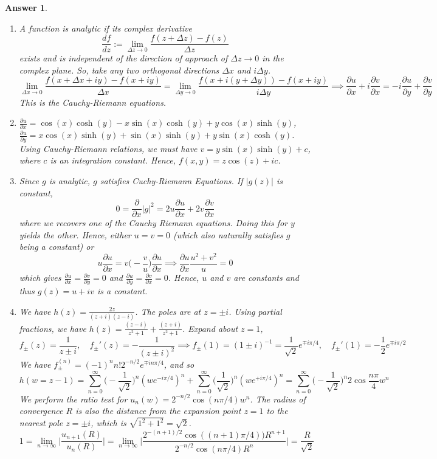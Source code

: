 \documentclass[a4paper]{article}
\newtheorem{ans}{Answer}[section]
\theoremstyle{new}
\begin{document}
\begin{ans}\leavevmode
\begin{enumerate}[label=(\alph*)]
\item A function is analytic if its complex derivative
$$\frac{df}{dz}:=\lim_{\Delta z\rightarrow0}\frac{f(z+\Delta z)-f(z)}{\Delta z}$$
exists and is independent of the direction of approach of $\Delta z\rightarrow0$ in the complex plane. So, take any two orthogonal directions $\Delta x$ and $i\Delta y$.
$$\lim_{\Delta x\rightarrow0}\frac{f(x+\Delta x+iy)-f(x+iy)}{\Delta x}=\lim_{\Delta y\rightarrow0}\frac{f(x+i(y+\Delta y))-f(x+iy)}{i\Delta y}\implies\frac{\partial u}{\partial x}+i\frac{\partial v}{\partial x}=-i\frac{\partial u}{\partial y}+\frac{\partial v}{\partial y}$$
This is the Cauchy-Riemann equations.
\item $\frac{\partial u}{\partial x}=\cos(x)\cosh(y)-x\sin(x)\cosh(y)+y\cos(x)\sinh(y)$, $\frac{\partial u}{\partial y}=x\cos(x)\sinh(y)+\sin(x)\sinh(y)+y\sin(x)\cosh(y)$. Using Cauchy-Riemann relations, we must have $v=y\sin(x)\sinh(y)+c$, where $c$ is an integration constant. Hence, $f(x,y)=z\cos(z)+ic$.
\item Since $g$ is analytic, $g$ satisfies Cuchy-Riemann Equations. If $|g(z)|$ is constant,
$$0=\frac{\partial}{\partial x}|g|^2=2u\frac{\partial u}{\partial x}+2v\frac{\partial v}{\partial x}$$
where we recovers one of the Cauchy Riemann equations. Doing this for $y$ yields the other. Hence, either $u=v=0$ (which also naturally satisfies $g$ being a constant) or
$$u\frac{\partial u}{\partial x}=v\bigg(-\frac{v}{u}\bigg)\frac{\partial u}{\partial x}\implies\frac{\partial u}{\partial x}\frac{u^2+v^2}{u}=0$$
which gives $\frac{\partial u}{\partial x}=\frac{\partial v}{\partial y}=0$ and $\frac{\partial u}{\partial y}=\frac{\partial v}{\partial x}=0$. Hence, $u$ and $v$ are constants and thus $g(z)=u+iv$ is a constant.
\item We have $h(z)=\frac{2z}{(z+i)(z-i)}$. The poles are at $z=\pm i$. Using partial fractions, we have
$h(z)=\frac{(z-i)}{z^2+1}+\frac{(z+i)}{z^2+1}$.
Expand about $z=1$,
$$f_{\pm}(z)=\frac{1}{z\pm i},\quad f_\pm'(z)=-\frac{1}{(z\pm i)^2}\implies f_\pm(1)=(1\pm i)^{-1}=\frac{1}{\sqrt{2}}e^{\mp i\pi/4},\quad  f_\pm'(1)=-\frac{1}{2}e^{\mp i\pi/2}$$
We have $f_\pm^{(n)}=(-1)^nn!2^{-n/2}e^{\mp in\pi/4}$, and so
$$h(w=z-1)=\sum_{n=0}^\infty\bigg(-\frac{1}{\sqrt{2}}\bigg)^n(we^{-i\pi/4})^n+\sum_{n=0}^\infty\bigg(\frac{1}{\sqrt{2}}\bigg)^n(we^{+i\pi/4})^n=\sum_{n=0}^\infty\bigg(-\frac{1}{\sqrt{2}}\bigg)^n2\cos\frac{n\pi}{4}w^n$$
We perform the ratio test for $u_n(w)=2^{-n/2}\cos(n\pi/4)w^n$. The radius of convergence $R$ is also the distance from the expansion point $z=1$ to the nearest pole $z=\pm i$, which is $\sqrt{1^2+1^2}=\sqrt{2}$.
$$1=\lim_{n\rightarrow\infty}\bigg|\frac{u_{n+1}(R)}{u_n(R)}\bigg|=\lim_{n\rightarrow\infty}\bigg|\frac{2^{-(n+1)/2}\cos((n+1)\pi/4))R^{n+1}}{2^{-n/2}\cos(n\pi/4)R^n}\bigg|=\frac{R}{\sqrt{2}}$$
\end{enumerate}
\end{ans}
\end{document}
